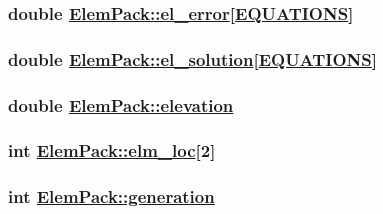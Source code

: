 \hypertarget{structElemPack_o27}{
\subsubsection[el\_\-error]{\setlength{\rightskip}{0pt plus 5cm}double \hyperlink{structElemPack_o27}{Elem\-Pack::el\_\-error}\mbox{[}\hyperlink{constant_8h_a16}{EQUATIONS}\mbox{]}}}
\label{structElemPack_o27}


\hypertarget{structElemPack_o28}{
\subsubsection[el\_\-solution]{\setlength{\rightskip}{0pt plus 5cm}double \hyperlink{structElemPack_o28}{Elem\-Pack::el\_\-solution}\mbox{[}\hyperlink{constant_8h_a16}{EQUATIONS}\mbox{]}}}
\label{structElemPack_o28}


\hypertarget{structElemPack_o25}{
\subsubsection[elevation]{\setlength{\rightskip}{0pt plus 5cm}double \hyperlink{structElemPack_o25}{Elem\-Pack::elevation}}}
\label{structElemPack_o25}


\hypertarget{structElemPack_o17}{
\subsubsection[elm\_\-loc]{\setlength{\rightskip}{0pt plus 5cm}int \hyperlink{structElemPack_o17}{Elem\-Pack::elm\_\-loc}\mbox{[}2\mbox{]}}}
\label{structElemPack_o17}


\hypertarget{structElemPack_o1}{
\subsubsection[generation]{\setlength{\rightskip}{0pt plus 5cm}int \hyperlink{structElemPack_o1}{Elem\-Pack::generation}}}
\label{structElemPack_o1}


